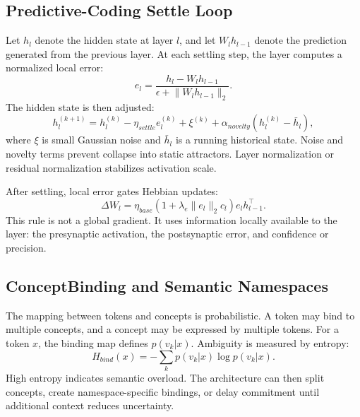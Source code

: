 \documentclass[11pt]{article}
\begin{document}
\subsection{Predictive-Coding Settle Loop}
Let $h_l$ denote the hidden state at layer $l$, and let $W_l h_{l-1}$ denote the prediction generated from the previous layer. At each settling step, the layer computes a normalized local error:
\begin{equation}
 e_l = \frac{h_l - W_l h_{l-1}}{\epsilon + \lVert W_l h_{l-1}\rVert_2}.
\end{equation}
The hidden state is then adjusted:
\begin{equation}
 h_l^{(k+1)} = h_l^{(k)} - \eta_{settle}e_l^{(k)} + \xi^{(k)} + \alpha_{novelty}(h_l^{(k)}-\bar{h}_l),
\end{equation}
where $\xi$ is small Gaussian noise and $\bar{h}_l$ is a running historical state. Noise and novelty terms prevent collapse into static attractors. Layer normalization or residual normalization stabilizes activation scale.

After settling, local error gates Hebbian updates:
\begin{equation}
 \Delta W_l = \eta_{base}\left(1 + \lambda_e\lVert e_l\rVert_2 c_l\right)e_l h_{l-1}^{\top}.
\end{equation}
This rule is not a global gradient. It uses information locally available to the layer: the presynaptic activation, the postsynaptic error, and confidence or precision.

\subsection{ConceptBinding and Semantic Namespaces}
The mapping between tokens and concepts is probabilistic. A token may bind to multiple concepts, and a concept may be expressed by multiple tokens. For a token $x$, the binding map defines $p(v_k|x)$. Ambiguity is measured by entropy:
\begin{equation}
 H_{bind}(x)=-\sum_k p(v_k|x)\log p(v_k|x).
\end{equation}
High entropy indicates semantic overload. The architecture can then split concepts, create namespace-specific bindings, or delay commitment until additional context reduces uncertainty.
\end{document}
